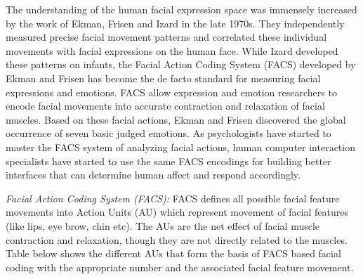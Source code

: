 \documentclass[oneside,11pt]{memoir}
\begin{document}
The understanding of the human facial expression space was immensely increased by the work of Ekman, Frisen \cite{ekman_facial_1978} and Izard \cite{izard_maximally_1983} in the late 1970s. They independently measured precise facial movement patterns and correlated these individual movements with facial expressions on the human face. While Izard developed these patterns on infants, the Facial Action Coding System (FACS) developed by Ekman and Frisen has become the de facto standard for measuring facial expressions and emotions. FACS allow expression and emotion researchers to encode facial movements into accurate contraction and relaxation of facial muscles. Based on these facial actions, Ekman and Frisen discovered the global occurrence of seven basic judged emotions. As psychologists have started to master the FACS system of analyzing facial actions, human computer interaction specialists have started to use the same FACS encodings for building better interfaces that can determine human affect and respond accordingly.

\emph{Facial Action Coding System (FACS):}
FACS defines all possible facial feature movements into Action Units (AU) which represent movement of facial features (like lips, eye brow, chin etc). The AUs are the net effect of facial muscle contraction and relaxation, though they are not directly related to the muscles. Table below shows the different AUs that form the basis of FACS based facial coding with the appropriate number and the associated facial feature movement.
\end{document}
